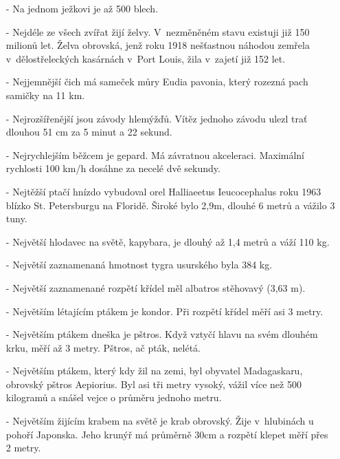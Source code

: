 \begin{multicols}{2}
\begin{itemize}
\item[-] Na jednom ježkovi je až 500 blech.

\item[-] Nejdéle ze všech zvířat žijí želvy. V~nezměněném stavu 
existuji již 150 milionů let. Želva obrovská, jenž roku 1918 
nešťastnou náhodou zemřela v~dělostřeleckých kasárnách 
v~Port Louis, žila v~zajetí již 152 let.

\item[-] Nejjemnější čich má sameček můry Eudia pavonia, který rozezná 
pach samičky na 11 km.

\item[-] Nejrozšířenější jsou závody hlemýžďů. Vítěz jednoho závodu ulezl 
trať dlouhou 51 cm za 5 minut a 22 sekund.

\item[-] Nejrychlejším běžcem je gepard. Má závratnou akceleraci. Maximální 
rychlosti 100 km/h dosáhne za necelé dvě sekundy.

\item[-] Nejtěžší ptačí hnízdo vybudoval orel Halliaeetus Ieucocephalus 
roku 1963 blízko St. Petersburgu na Floridě. Široké bylo 2,9m, 
dlouhé 6 metrů a vážilo 3 tuny.

\item[-] Největší hlodavec na světě, kapybara, je dlouhý až 1,4 metrů 
a váží 110 kg.

\item[-] Největší zaznamenaná hmotnost tygra usurského byla 384 kg.

\item[-] Největší zaznamenané rozpětí křídel měl albatros stěhovavý
(3,63 m).

\item[-] Největším létajícím ptákem je kondor. Při rozpětí křídel měří 
asi 3 metry.

\item[-] Největším ptákem dneška je pštros. Když vztyčí hlavu na svém 
dlouhém krku, měří až 3 metry. Pštros, ač pták, nelétá.

\item[-] Největším ptákem, který kdy žil na zemi, byl obyvatel Madagaskaru, 
obrovský pštros Aepiorius. Byl asi tři metry vysoký, vážil více 
než 500 kilogramů a snášel vejce o průměru jednoho metru.

\item[-] Největším žijícím krabem na světě je krab obrovský. Žije v~hlubinách 
u pohoří Japonska. Jeho krunýř má průměrně 30cm a rozpětí klepet 
měří přes 2 metry.


\end{itemize}
\end{multicols}
